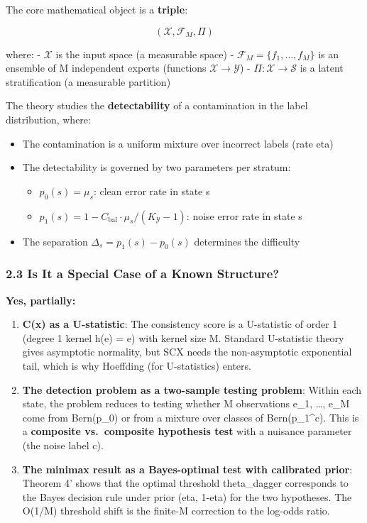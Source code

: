 \documentclass[
  12pt,
]{article}
\providecommand{\tightlist}{%
  \setlength{\itemsep}{0pt}\setlength{\parskip}{0pt}}
\begin{document}
The core mathematical object is a \textbf{triple}:

\[(\mathcal{X}, \mathcal{F}_M, \Pi)\]

where: - \(\mathcal{X}\) is the input space (a measurable space) -
\(\mathcal{F}_M = \{f_1, \dots, f_M\}\) is an ensemble of M independent
experts (functions \(\mathcal{X} \to \mathcal{Y}\)) -
\(\Pi: \mathcal{X} \to \mathcal{S}\) is a latent stratification (a
measurable partition)

The theory studies the \textbf{detectability} of a contamination in the
label distribution, where:

\begin{itemize}
\tightlist
\item
  The contamination is a uniform mixture over incorrect labels (rate
  eta)
\item
  The detectability is governed by two parameters per stratum:

  \begin{itemize}
  \tightlist
  \item
    \(p_0(s) = \mu_s\): clean error rate in state s
  \item
    \(p_1(s) = 1 - C_{\text{bal}}\cdot\mu_s/(K_{\mathcal{Y}}-1)\): noise
    error rate in state s
  \end{itemize}
\item
  The separation \(\Delta_s = p_1(s) - p_0(s)\) determines the
  difficulty
\end{itemize}

\subsubsection{2.3 Is It a Special Case of a Known
Structure?}\label{is-it-a-special-case-of-a-known-structure}

\textbf{Yes, partially:}

\begin{enumerate}
\def\labelenumi{\arabic{enumi}.}
\item
  \textbf{C(x) as a U-statistic}: The consistency score is a U-statistic
  of order 1 (degree 1 kernel h(e) = e) with kernel size M. Standard
  U-statistic theory gives asymptotic normality, but SCX needs the
  non-asymptotic exponential tail, which is why Hoeffding (for
  U-statistics) enters.
\item
  \textbf{The detection problem as a two-sample testing problem}: Within
  each state, the problem reduces to testing whether M observations
  e\_1, \ldots, e\_M come from Bern(p\_0) or from a mixture over classes
  of Bern(p\_1\^{}c). This is a \textbf{composite vs.~composite
  hypothesis test} with a nuisance parameter (the noise label c).
\item
  \textbf{The minimax result as a Bayes-optimal test with calibrated
  prior}: Theorem 4' shows that the optimal threshold theta\_dagger
  corresponds to the Bayes decision rule under prior (eta, 1-eta) for
  the two hypotheses. The O(1/M) threshold shift is the finite-M
  correction to the log-odds ratio.
\end{enumerate}
\end{document}
